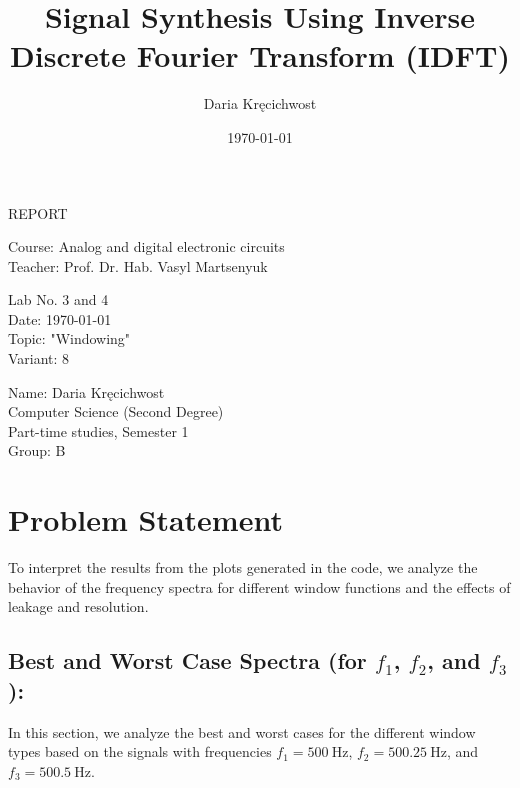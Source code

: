 \documentclass[12pt]{article}
\begin{document}
\title{Signal Synthesis Using Inverse Discrete Fourier Transform (IDFT)}
\author{Daria Kręcichwost}
\date{\today}

\begin{titlepage}
    \centering
    \vspace*{2cm}
    
    \Huge
    REPORT
    
    \vspace{1cm}
    
    \Large
    Course: Analog and digital electronic circuits \\
    Teacher: Prof. Dr. Hab. Vasyl Martsenyuk
    
    \vfill
    
    \Large
    Lab No. 3 and 4\\
    Date: \today \\
    Topic: "Windowing" \\
    Variant: 8
    
    \vspace{1cm}
    
    \large
    Name: Daria Kręcichwost \\
    Computer Science (Second Degree) \\
    Part-time studies, Semester 1 \\
    Group: B
\end{titlepage}

\newpage

\section{Problem Statement}

To interpret the results from the plots generated in the code, we analyze the behavior of the frequency spectra for different window functions and the effects of leakage and resolution.

\subsection*{Best and Worst Case Spectra (for \(f_1\), \(f_2\), and \(f_3\)):}

In this section, we analyze the best and worst cases for the different window types based on the signals with frequencies \(f_1 = 500 \ \text{Hz}\), \(f_2 = 500.25 \ \text{Hz}\), and \(f_3 = 500.5 \ \text{Hz}\).
\end{document}

